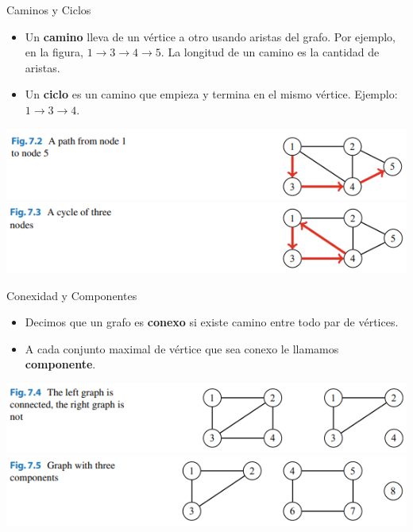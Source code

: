 \documentclass{beamer}
\begin{document}
\begin{frame}{Caminos y Ciclos}
	\begin{itemize}
		\item Un \textbf{camino} lleva de un vértice a otro usando aristas del grafo. Por ejemplo, en la figura, $1 \rightarrow 3 \rightarrow 4 \rightarrow 5$. La longitud de un camino es la cantidad de aristas.
		\item Un \textbf{ciclo} es un camino que empieza y termina en el mismo vértice. Ejemplo: $1 \rightarrow 3 \rightarrow 4$.
	\end{itemize}
	
	\begin{center}
		\includegraphics[]{figuras/7.2-camino-simple.PNG}
		\includegraphics[]{figuras/7.3-ciclo.PNG}
	\end{center}
\end{frame}

\begin{frame}{Conexidad y Componentes}
	\begin{itemize}
		\item Decimos que un grafo es \textbf{conexo} si existe camino entre todo par de vértices.
		\item A cada conjunto maximal de vértice que sea conexo le llamamos \textbf{componente}.
	\end{itemize}
	
	\begin{center}
		\includegraphics[]{figuras/7.4-conexo.PNG}
		\includegraphics[]{figuras/7.5-componentes.PNG}
	\end{center}
\end{frame}
\end{document}
